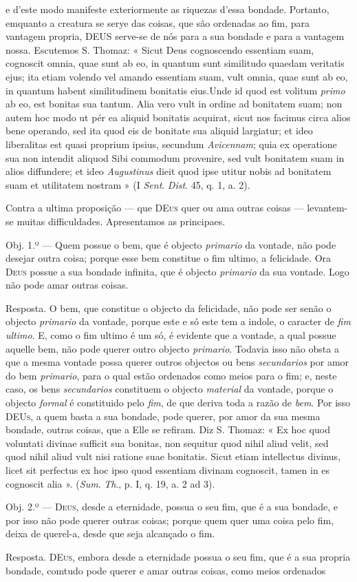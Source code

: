 e d'este modo manifeste exteriormente as riquezas d'essa bondade. Portanto, emquanto a creatura se serye das coisas, que são ordenadas ao fim, para vantagem propria, \textsc{DEUS} serve-se de nós para a sua bondade e para a vantagem nossa. Escutemos S. Thomaz: « Sicut Deus cognoscendo essentiam suam, cognoscit omnia, quae sunt ab eo, in quantum sunt similitudo quaedam veritatis ejus; ita etiam volendo vel amando essentiam suam, vult omnia, quae sunt ab eo, in quantum habent similitudinem bonitatis eius.Unde id quod est volitum \emph{primo} ab eo, est bonitas sua tantum. Alia vero vult in ordine ad bonitatem suam; non autem hoc modo ut pér ea aliquid bonitatis acquirat, sicut nos facimus circa alios bene operando, sed ita quod eis de bonitate sua aliquid largiatur; et ideo liberalitas est quasi proprium ipsius, secundum \emph{Avicennam}; quia ex operatione sua non intendit aliquod Sibi commodum provenire, sed vult bonitatem suam in alios diffundere; et ideo \emph{Augustinus} dieit quod ipse utitur nobis ad bonitatem suam et utilitatem nostram » (I \emph{Sent}. \emph{Dist}. 45, q. 1, a. 2).\par Contra a ultima proposição --- que \textsc{DEus} quer ou ama outras coisas --- levantem-se muitas difficuldades. Apresentamos as principaes.\par Obj. 1.º --- Quem possue o bem, que é objecto \emph{primario} da vontade, não pode desejar outra coisa; porque esse bem constitue o fim ultimo, a felicidade. Ora \textsc{Deus} possue a sua bondade infinita, que é objecto \emph{primario} da sua vontade. Logo não pode amar outras coisas.\par Resposta. O bem, que constitue o objecto da felicidade, não pode ser senão o objecto \emph{primario} da vontade, porque este e só este tem a indole, o caracter de \emph{fim ultimo}. E, como o fim ultimo é um só, é evidente que a vontade, a qual possue aquelle bem, não pode querer outro objecto \emph{primario}. Todavia isso não obsta a que a mesma vontade possa querer outros objectos ou bens \emph{secundarios} por amor do bem \emph{primario}, para o qual estão ordenados como meios para o fim; e, neste caso, os bens \emph{secundarios} constituem o objecto \emph{material} da vontade, porque o objecto \emph{formal} é constituido pelo \emph{fim}, de que deriva toda a razão de \emph{bem}. Por isso \textsc{DEUs}, a quem basta a sua bondade, pode querer, por amor da sua mesma bondade, outras coisas, que a Elle se refiram. Diz S. Thomaz: « Ex hoc quod voluntati divinae sufficit sua bonitas, non sequitur quod nihil aliud velit, sed quod nihil aliud vult nisi ratione suae bonitatis. Sicut etiam intellectus divinus, licet sit perfectus ex hoc ipso quod essentiam divinam cognoscit, tamen in es cognoscit alia ». (\emph{Sum}. \emph{Th}., p. I, q. 19, a. 2 ad 3).\par Obj. 2.º --- \textsc{Deus}, desde a eternidade, possua o seu fim, que é a sua bondade, e por isso não pode querer outras coisas; porque quem quer uma coisa pelo fim, deixa de querel-a, desde que seja alcançado o fim.\par Resposta. \textsc{DEus}, embora desde a eternidade possua o seu fim, que é a sua propria bondade, comtudo pode querer e amar outras coisas, como meios ordenados 